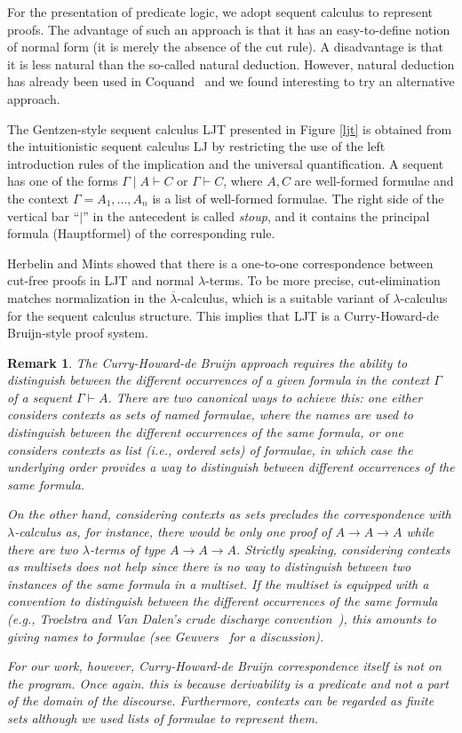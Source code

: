\documentclass{svjour3}                     %
\newtheorem{rem}[thm]{Remark}
\newcommand{\imp}{\rightarrow}
\newcommand{\Ga}{\Gamma}
\newcommand{\la}{\lambda}
\newcommand{\vd}{\vdash}
\begin{document}
For the presentation of predicate logic, we adopt sequent calculus to represent proofs. The advantage of such an approach is that it has an easy-to-define notion of normal form (it is merely the absence of the cut rule). 
A disadvantage is that it is less natural than the so-called natural deduction. However, natural deduction has already been used in Coquand~\cite{cCoquand93} and we found interesting to try an alternative approach.

The Gentzen-style sequent calculus LJT presented in Figure \ref{ljt} is obtained from the intuitionistic sequent calculus LJ by restricting the use of the left introduction rules of the implication and the universal quantification. 
A sequent has one of the forms $\Ga\mid A \vd C$ or $\Ga \vd C$, where $A, C$ are well-formed formulae and the context $\Ga=A_1,...,A_n$ is a list of well-formed formulae. The right side of the vertical bar ``$\mid$'' in the antecedent is called {\em stoup}, and it contains the principal formula (Hauptformel) of the corresponding rule.

Herbelin \cite{Herbelin94,HerbelinPhD} and Mints \cite{mints96} showed that there is a one-to-one correspondence between cut-free proofs in LJT and normal $\la$-terms. 
To be more precise, cut-elimination matches normalization in the $\overline{\lambda}$-calculus, which is a suitable variant of $\lambda$-calculus for the sequent calculus structure. This implies that LJT is a Curry-Howard-de Bruijn-style proof system.

\begin{rem}
  The Curry-Howard-de Bruijn approach requires the ability to distinguish between the different occurrences of a given formula in the context $\Gamma$ of a sequent $\Gamma \vdash A$. There are two canonical ways to achieve this: one either considers contexts as sets of {\em named} formulae, where the names are used to distinguish between the different occurrences of the same formula, or one considers contexts as list (i.e., ordered sets) of formulae, in which case the underlying order provides a way to distinguish between different occurrences of the same formula. 

  On the other hand, considering contexts as sets precludes the correspondence with $\lambda$-calculus as, for instance, there would be only one proof of $A \imp A \imp A$ while there are two $\lambda$-terms of type $A \imp A \imp A$. Strictly speaking, considering contexts as multisets does not help since there is no way to distinguish between two instances of the same formula in a multiset. If the multiset is equipped with a convention to distinguish between the different occurrences of the same formula (e.g., Troelstra and Van Dalen's crude discharge convention~\cite[Ch.~1]{TroelstraVanDalen88}), this amounts to giving names to formulae (see Geuvers~\cite{GeuversPhD} for a discussion).

For our work, however, Curry-Howard-de Bruijn correspondence itself is not on the program. Once again. this is because derivability is a predicate and not a part of the domain of the discourse. Furthermore, contexts can be regarded as finite sets although we used lists of formulae to represent them.
\end{rem}
\end{document}

